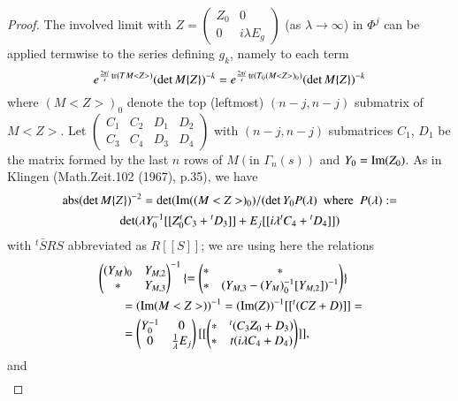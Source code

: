 \begin{proof}
The involved limit with $Z=\left(\begin{smallmatrix} Z_{0} & 0\\ 0 &
  i\lambda E_{g}\end{smallmatrix}\right)$ (as $\lambda\to \infty$) in
$\Phi^{j}$ can be applied termwise to the series defining $g_{k}$,
namely to each term
$$
e^{\frac{2\pi i}{s}\operatorname{tr}(TM<Z>)}(\det M\{Z\})^{-k}=e^{\frac{2\pi
    i}{s}\operatorname{tr}(T_{0}(M<Z>)_{0})}(\det M\{Z\})^{-k} 
$$
where $(M<Z>)_{0}$ denote the top (leftmost) $(n-j,n-j)$ submatrix of
$M<Z>$. Let $\left(\begin{smallmatrix} C_{1} & C_{2} & D_{1} &
  D_{2}\\ C_{3} & C_{4} & D_{3} & D_{4}
\end{smallmatrix}\right)$ with $(n-j,n-j)$ submatrices $C_{1}$,
$D_{1}$ be the matrix formed by the last $n$ rows of $M(\text{in }
\Gamma_{n}(s))$ and $Y_{0}=\operatorname{Im}(Z_{0})$. As in Klingen
(Math.\@\pageoriginale Zeit.\@ 102 (1967), p.35), we have
\begin{gather*}
\operatorname{abs}(\det M\{Z\})^{-2}=\det(\operatorname{Im}((M<Z>)_{0})/(\det
Y_{0}P(\lambda)\text{ \ where \ } P(\lambda):=\\
\det(\lambda
Y^{-1}_{0}[[Z_{0}^{t}C_{3}+{}^{t}D_{3}]]+E_{j}[[i\lambda{}^{t}C_{4}+{}^{t}D_{4}]]) 
\end{gather*}
with ${}^{t} \bar{S}RS$ abbreviated as $R[[S]]$; we are using here the
relations
\begin{align*}
& \begin{pmatrix}
(Y_{M})_{0} & Y_{M,2}\\
\ast & Y_{M,3}
\end{pmatrix}
^{-1}\{=
\begin{pmatrix}
\ast & \ast\\ 
\ast & (Y_{M,3}-(Y_{M})^{-1}_{0}[Y_{M,2}])^{-1}
\end{pmatrix}\}\\
 &\qquad =
(\operatorname{Im}(M<Z>))^{-1}=(\operatorname{Im}(Z))^{-1}[[{}^{t}(CZ+D)]]=\\
&\qquad = 
\begin{pmatrix}
Y^{-1}_{0} & 0\\
0 & \frac{1}{\lambda}E_{j}
\end{pmatrix}
[[
\begin{pmatrix}
\ast & {}^{t}(C_{3}Z_{0}+D_{3})\\
\ast & t(i\lambda C_{4}+D_{4})
\end{pmatrix}
]],
\end{align*}
and
\begin{align*}

\end{align*}
\end{proof}
